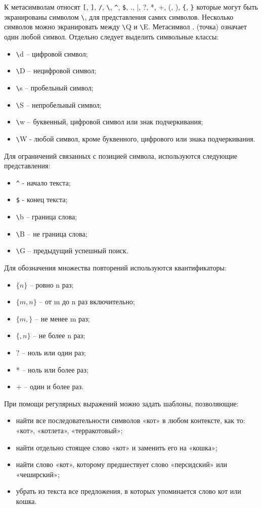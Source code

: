 К метасимволам относят \verb![!, \verb!]!, \verb!/!, \verb!\!, \verb!^!, \verb!$!, ., |, ?, *, +, (, ), \verb!{!, \verb!}! которые могут быть экранированы символом \verb!\!, для представления самих символов. Несколько символов можно экранировать между \verb!\!Q и \verb!\!E.
Метасимвол . (точка) означает один любой символ.
Отдельно следует выделить символьные классы:
\begin{itemize}
	\item \verb!\!d – цифровой символ;
	\item \verb!\!D – нецифровой символ;
	\item \verb!\!s – пробельный символ;
	\item \verb!\!S – непробельный символ;
	\item \verb!\!w – буквенный, цифровой символ или знак подчеркивания;
	\item \verb!\!W - любой символ, кроме буквенного, цифрового или знака подчеркивания.
\end{itemize}
Для ограничений связанных с позицией символа, используются следующие представления:
\begin{itemize}
	\item \verb!^! - начало текста;
	\item \verb!$! - конец текста;
	\item \verb!\!b – граница слова;
	\item \verb!\!B – не граница слова;
	\item \verb!\!G – предыдущий успешный поиск.
\end{itemize}
Для обозначения множества повторений используются квантификаторы:
\begin{itemize}
	\item \(\{n\}\) – ровно n раз;
	\item \(\{m, n\}\) – от m до n раз включительно;
	\item \(\{m, \}\) – не менее m раз;
	\item \(\{, n\}\) – не более n раз;
	\item ? – ноль или один раз;
	\item * – ноль или более раз;
	\item + – один и более раз.
\end{itemize}

При помощи регулярных выражений можно задать шаблоны, позволяющие:
\begin{itemize}
	\item найти все последовательности символов «кот» в любом контексте, как то: «кот», «котлета», «терракотовый»;
	\item найти отдельно стоящее слово «кот» и заменить его на «кошка»;
	\item найти слово «кот», которому предшествует слово «персидский» или «чеширский»;
	\item убрать из текста все предложения, в которых упоминается слово кот или кошка.
\end{itemize}

